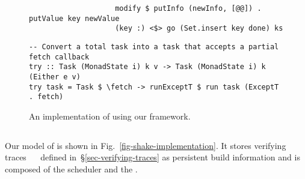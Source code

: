 \begin{figure}
\begin{verbatim}
                    modify $ putInfo (newInfo, [@@]) . putValue key newValue
                    (key :) <$> go (Set.insert key done) ks
\end{verbatim}
\vspace{0mm}
\begin{verbatim}
-- Convert a total task into a task that accepts a partial fetch callback
try :: Task (MonadState i) k v -> Task (MonadState i) k (Either e v)
try task = Task $ \fetch -> runExceptT $ run task (ExceptT . fetch)
\end{verbatim}
\vspace{-3mm}
\caption{An implementation of \Excel using our framework.}\label{fig-excel-implementation}
\vspace{-5mm}
\end{figure}

\vspace{-1mm}
\subsection{\Shake}\label{sec-implementation-shake}
\vspace{-1mm}

Our model of \Shake is shown in Fig.~\ref{fig-shake-implementation}. It stores
verifying traces ~~ defined in~\S\ref{sec-verifying-traces}
as persistent build information and is composed of the  scheduler
and the .

